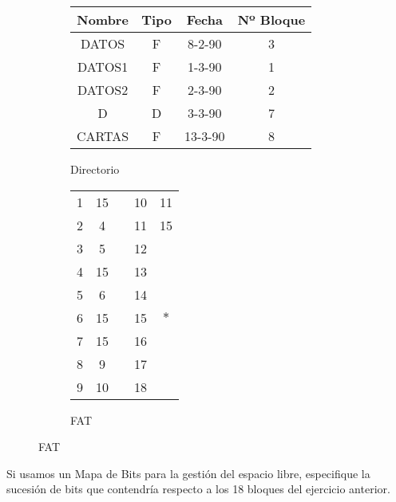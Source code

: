 \begin{ejercicio}
    \begin{figure}[H]
        \centering
        \begin{subfigure}[c]{0.5\textwidth}
            \centering
            \begin{tabular}{|c|c|c|c|}
                Nombre & Tipo & Fecha  & Nº Bloque \\ \hline \hline
                DATOS  & F    & 8-2-90 & 3         \\ \hline
                DATOS1 & F    & 1-3-90 & 1         \\ \hline
                DATOS2 & F    & 2-3-90 & 2         \\ \hline
                D      & D    & 3-3-90 & 7          \\ \hline
                CARTAS & F    & 13-3-90& 8         \\ \hline
            \end{tabular}
            \caption{Directorio}
        \end{subfigure}\hfill
        \begin{subfigure}[c]{0.5\textwidth}
            \centering
            \begin{tabular}{c|c|cc|c|}
                \cline{2-2} \cline{5-5}
                1 & 15 &\hspace{1cm}& 10 & 11 \\ \cline{2-2} \cline{5-5} 
                2 & 4  && 11 & 15 \\ \cline{2-2} \cline{5-5} 
                3 & 5  && 12 &  \\ \cline{2-2} \cline{5-5} 
                4 & 15 && 13 &  \\ \cline{2-2} \cline{5-5} 
                5 & 6  && 14 &  \\ \cline{2-2} \cline{5-5} 
                6 & 15 && 15 & $\ast$ \\ \cline{2-2} \cline{5-5} 
                7 & 15 && 16 &  \\ \cline{2-2} \cline{5-5} 
                8 & 9  && 17 &  \\ \cline{2-2} \cline{5-5} 
                9 & 10 && 18 &  \\ \cline{2-2} \cline{5-5} 
            \end{tabular}
            \caption{FAT}
        \end{subfigure}
    \end{figure}
\end{ejercicio}

\begin{ejercicio}
Si usamos un Mapa de Bits para la gestión del espacio libre, especifique la sucesión de bits que contendría respecto a los 18 bloques del ejercicio anterior.
\end{ejercicio}

